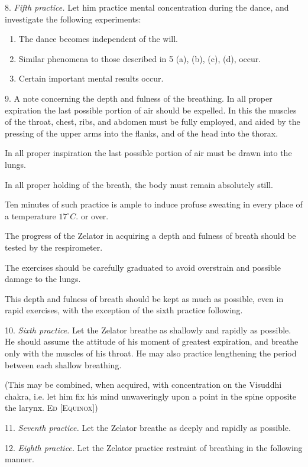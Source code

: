 8. \textit{Fifth practice.} Let him practice mental concentration during the dance, and investigate the following experiments:

\begin{enumerate}[label=(\alph*)]
\item The dance becomes independent of the will.
\item Similar phenomena to those described in 5 (a), (b), (c), (d), occur.
\item Certain important mental results occur.
\end{enumerate}

9. A note concerning the depth and fulness of the breathing. In all proper expiration the last possible portion of air should be expelled. In this the muscles of the throat, chest, ribs, and abdomen must be fully employed, and aided by the pressing of the upper arms into the flanks, and of the head into the thorax.

In all proper inspiration the last possible portion of air must be drawn into the lungs.

In all proper holding of the breath, the body must remain absolutely still.

Ten minutes of such practice is ample to induce profuse sweating in every place of a temperature $17^{\circ}C.$ or over.

The progress of the Zelator in acquiring a depth and fulness of breath should be tested by the respirometer.

The exercises should be carefully graduated to avoid overstrain and possible damage to the lungs.

This depth and fulness of breath should be kept as much as possible, even in rapid exercises, with the exception of the sixth practice following.

10. \textit{Sixth practice.} Let the Zelator breathe as shallowly and rapidly as possible. He should assume the attitude of his moment of greatest expiration, and breathe only with the muscles of his throat. He may also practice lengthening the period between each shallow breathing.

(This may be combined, when acquired, with concentration on the Visuddhi chakra, i.e. let him fix his mind unwaveringly upon a point in the spine opposite the larynx. \textsc{Ed [Equinox]})

11. \textit{Seventh practice.} Let the Zelator breathe as deeply and rapidly as possible.

12. \textit{Eighth practice.} Let the Zelator practice restraint of breathing in the following manner.

